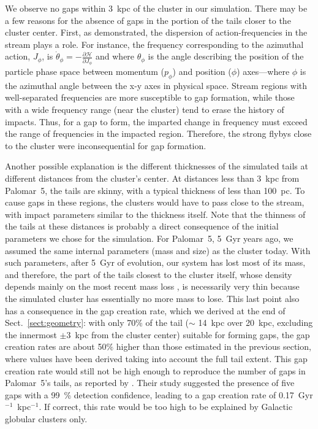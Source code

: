 \documentclass{aa}
\begin{document}
    We observe no gaps within 3~kpc of the cluster in our simulation. There may be a few reasons for the absence of gaps in the portion of the tails closer to the cluster center. First, as \citet{2016MNRAS.457.3817S} demonstrated, the dispersion of action-frequencies in the stream plays a role. For instance, the frequency corresponding to the azimuthal action, $J_\phi$, is $\dot\theta_\phi = - \frac{\mathcal{\partial H}}{\partial J_\phi}$ and where $\theta_\phi$ is the angle describing the position of the particle phase space between momentum ($p_\phi$) and position ($\phi$) axes---where $\phi$ is the azimuthal angle between the x-y axes in physical space. Stream regions with well-separated frequencies are more susceptible to gap formation, while those with a wide frequency range (near the cluster) tend to erase the history of impacts. Thus, for a gap to form, the imparted change in frequency must exceed the range of frequencies in the impacted region. Therefore, the strong flybys close to the cluster were inconsequential for gap formation. 
    
    Another possible explanation is the different thicknesses of the simulated tails at different distances from the cluster's center. At distances less than 3~kpc from Palomar~5, the tails are skinny, with a typical thickness of less than 100~pc. To cause gaps in these regions, the clusters would have to pass close to the stream, with impact parameters similar to the thickness itself. Note that the thinness of the tails at these distances is probably a direct consequence of the initial parameters we chose for the simulation. For Palomar~5, 5~Gyr years ago, we assumed the same internal parameters (mass and size) as the cluster today. With such parameters, after 5~Gyr of evolution, our system has lost most of its mass, and therefore, the part of the tails closest to the cluster itself, whose density depends mainly on the most recent mass loss \citep[see, for example, Fig.~A.3 in][]{2012A&A...546L...7M}, is necessarily very thin because the simulated cluster has essentially no more mass to lose. This last point also has a consequence in the gap creation rate, which we derived at the end of Sect.~\ref{sect:geometry}: with only 70\% of the tail  ($\sim$ 14~kpc over 20~kpc, excluding the innermost $\pm 3$~kpc from the cluster center) suitable for forming gaps, the gap creation rates are about 50$\%$ higher than those estimated in the previous section, where values have been derived taking into account the full tail extent. This gap creation rate would still not be high enough to reproduce the number of gaps in Palomar~5's tails, as reported by \citet{2012ApJ...760...75C}. Their study suggested the presence of five gaps with a 99~\% detection confidence, leading to a gap creation rate of 0.17~Gyr$^{-1}$~kpc$^{-1}$. If correct, this rate would be too high to be explained by Galactic globular clusters only. 
\end{document}
